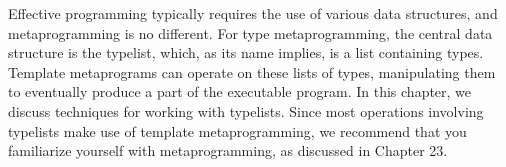 Effective programming typically requires the use of various data structures, and metaprogramming is no different. For type metaprogramming, the central data structure is the typelist, which, as its name implies, is a list containing types. Template metaprograms can operate on these lists of types, manipulating them to eventually produce a part of the executable program. In this chapter, we discuss techniques for working with typelists. Since most operations involving typelists make use of template metaprogramming, we recommend that you familiarize yourself with metaprogramming, as discussed in Chapter 23.